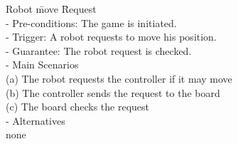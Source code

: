 {\normalsize
\begin{tabbing}
Robot \= move \= Request \\
- Pre-conditions: The game is initiated.\\
- Trigger: A robot requests to move his position.\\
- Guarantee: The robot request is checked.\\
- Main Scenarios\\
\>(a) The robot requests the controller if it may move\\
\>(b) The controller sends the request to the board\\
\>(c) The board checks the request\\
- Alternatives\\
\>none\\
\end{tabbing}
}